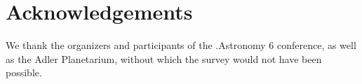\section{Acknowledgements}

We thank the organizers and participants of the .Astronomy 6 conference, as well as the Adler Planetarium, without which the survey would not have been possible.